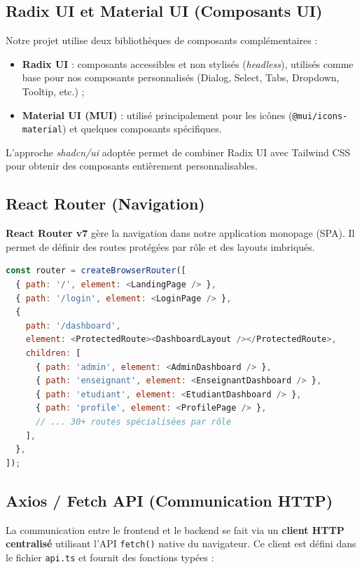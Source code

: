 \subsection{Radix UI et Material UI (Composants UI)}

Notre projet utilise deux bibliothèques de composants complémentaires :

\begin{itemize}
    \item \textbf{Radix UI} : composants accessibles et non stylisés (\textit{headless}), utilisés comme base pour nos composants personnalisés (Dialog, Select, Tabs, Dropdown, Tooltip, etc.) ;
    \item \textbf{Material UI (MUI)} : utilisé principalement pour les icônes (\texttt{@mui/icons-material}) et quelques composants spécifiques.
\end{itemize}

L'approche \textit{shadcn/ui} adoptée permet de combiner Radix UI avec Tailwind CSS pour obtenir des composants entièrement personnalisables.

\subsection{React Router (Navigation)}

\textbf{React Router v7} gère la navigation dans notre application monopage (SPA). Il permet de définir des routes protégées par rôle et des layouts imbriqués.

\begin{lstlisting}[language=JavaScript,caption={Extrait de la configuration des routes}]
const router = createBrowserRouter([
  { path: '/', element: <LandingPage /> },
  { path: '/login', element: <LoginPage /> },
  {
    path: '/dashboard',
    element: <ProtectedRoute><DashboardLayout /></ProtectedRoute>,
    children: [
      { path: 'admin', element: <AdminDashboard /> },
      { path: 'enseignant', element: <EnseignantDashboard /> },
      { path: 'etudiant', element: <EtudiantDashboard /> },
      { path: 'profile', element: <ProfilePage /> },
      // ... 30+ routes spécialisées par rôle
    ],
  },
]);
\end{lstlisting}

\subsection{Axios / Fetch API (Communication HTTP)}

La communication entre le frontend et le backend se fait via un \textbf{client HTTP centralisé} utilisant l'API \texttt{fetch()} native du navigateur. Ce client est défini dans le fichier \texttt{api.ts} et fournit des fonctions typées :

